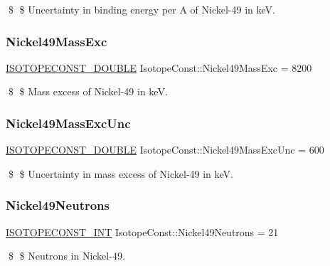 \$ \$ Uncertainty in binding energy per A of Nickel-\/49 in keV. \mbox{\label{group___isotope_const-_nickel-_ni49_ga0738ff2c68b95fec72cd92c357043b65}} 
\subsubsection{\texorpdfstring{Nickel49\+Mass\+Exc}{Nickel49MassExc}}
{\footnotesize\ttfamily \mbox{\hyperlink{group___isotope_const-_macros_ga8f45a7272ce02c0b4c65c44636ed719a}{I\+S\+O\+T\+O\+P\+E\+C\+O\+N\+S\+T\+\_\+\+D\+O\+U\+B\+LE}} Isotope\+Const\+::\+Nickel49\+Mass\+Exc = 8200}

\$ \$ Mass excess of Nickel-\/49 in keV. \mbox{\label{group___isotope_const-_nickel-_ni49_gabd719c28edbe1b51afbbf140b4b3e004}} 
\subsubsection{\texorpdfstring{Nickel49\+Mass\+Exc\+Unc}{Nickel49MassExcUnc}}
{\footnotesize\ttfamily \mbox{\hyperlink{group___isotope_const-_macros_ga8f45a7272ce02c0b4c65c44636ed719a}{I\+S\+O\+T\+O\+P\+E\+C\+O\+N\+S\+T\+\_\+\+D\+O\+U\+B\+LE}} Isotope\+Const\+::\+Nickel49\+Mass\+Exc\+Unc = 600}

\$ \$ Uncertainty in mass excess of Nickel-\/49 in keV. \mbox{\label{group___isotope_const-_nickel-_ni49_ga4e0286220347a4210a7fd13c94529449}} 
\subsubsection{\texorpdfstring{Nickel49\+Neutrons}{Nickel49Neutrons}}
{\footnotesize\ttfamily \mbox{\hyperlink{group___isotope_const-_macros_ga5f18360b3e99483a35c32d789e62621c}{I\+S\+O\+T\+O\+P\+E\+C\+O\+N\+S\+T\+\_\+\+I\+NT}} Isotope\+Const\+::\+Nickel49\+Neutrons = 21}

\$ \$ Neutrons in Nickel-\/49. \mbox{\label{group___isotope_const-_nickel-_ni49_ga84618ae03c5a906067f40e990c212358}} 
